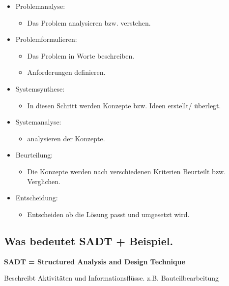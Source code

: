 \begin{itemize}
    \item Problemanalyse:
    \begin{itemize}
        \item Das Problem analysieren bzw. verstehen. 
    \end{itemize}
    \item Problemformulieren:
    \begin{itemize}
        \item Das Problem in Worte beschreiben.
        \item Anforderungen definieren.
    \end{itemize}
    \item Systemsynthese:
    \begin{itemize}
        \item In diesen Schritt werden Konzepte bzw. Ideen erstellt/ überlegt.
    \end{itemize}
    \item Systemanalyse:
    \begin{itemize}
        \item analysieren der Konzepte.
    \end{itemize}
    \item Beurteilung:
    \begin{itemize}
        \item Die Konzepte werden nach verschiedenen Kriterien Beurteilt bzw. Verglichen.
    \end{itemize}
    \item Entscheidung:
    \begin{itemize}
        \item Entscheiden ob die Lösung passt und umgesetzt wird.
    \end{itemize}
\end{itemize}

\subsection{Was bedeutet SADT + Beispiel.}
\textbf{SADT = Structured Analysis and Design Technique}

Beschreibt Aktivitäten und Informationsflüsse. z.B. Bauteilbearbeitung

